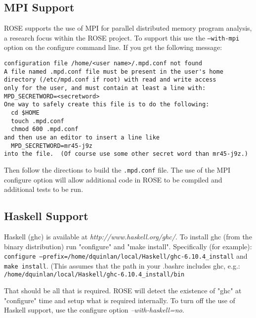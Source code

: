 
\subsection{MPI Support}
     ROSE supports the use of MPI for parallel distributed memory program analysis, a
research focus within the ROSE project.  To support this use the {\tt --with-mpi}
option on the configure command line.  If you get the following message:
\begin{verbatim}
configuration file /home/<user name>/.mpd.conf not found
A file named .mpd.conf file must be present in the user's home
directory (/etc/mpd.conf if root) with read and write access
only for the user, and must contain at least a line with:
MPD_SECRETWORD=<secretword>
One way to safely create this file is to do the following:
  cd $HOME
  touch .mpd.conf
  chmod 600 .mpd.conf
and then use an editor to insert a line like
  MPD_SECRETWORD=mr45-j9z
into the file.  (Of course use some other secret word than mr45-j9z.)
\end{verbatim}
Then follow the directions to build the {\tt .mpd.conf} file.  The use of the 
MPI configure option will allow additional code in ROSE to be compiled and 
additional tests to be run.

\subsection{Haskell Support}
   Haskell (ghc) is available at {\it http://www.haskell.org/ghc/}.
To install ghc (from the binary distribution) run "configure" and 
"make install". Specifically (for example): \\
{\tt configure --prefix=/home/dquinlan/local/Haskell/ghc-6.10.4\_install}
and
{\tt make install}.
(This assumes that the path in your .bashrc includes ghc, e.g.: \\
   {\tt /home/dquinlan/local/Haskell/ghc-6.10.4\_install/bin}

That should be all that is required.  ROSE will detect
the existence of "ghc" at "configure" time and setup
what is required internally.  To turn off the use of Haskell support, 
use the configure option {\em --with-haskell=no}.

